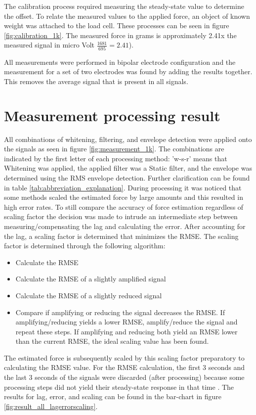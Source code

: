 The calibration process required measuring the steady-state value to determine the offset. To relate the measured values to the applied force, an object of known weight was attached to the load cell. These processes can be seen in figure \ref{fig:calibration_1k}. The measured force in grams is approximately 2.41x the measured signal in micro Volt $\frac{1681}{695} = 2.41$).

All measurements were performed in bipolar electrode configuration and the measurement for a set of two electrodes was found by adding the results together. This removes the average signal that is present in all signals.

\section{Measurement processing result}
All combinations of whitening, filtering, and envelope detection were applied onto the signals as seen in figure \ref{fig:measurement_1k}. The combinations are indicated by the first letter of each processing method: 'w-s-r' means that Whitening was applied, the applied filter was a Static filter, and the envelope was determined using the RMS envelope detection. Further clarification can be found in table \ref{tab:abbreviation_explanation}.
During processing it was noticed that some methods scaled the estimated force by large amounts and this resulted in high error rates. To still compare the accuracy of force estimation regardless of scaling factor the decision was made to intrude an intermediate step between measuring/compensating the lag and calculating the error. After accounting for the lag, a scaling factor is determined that minimizes the RMSE. The scaling factor is determined through the following algorithm:
\begin{itemize}
    \item Calculate the RMSE
    \item Calculate the RMSE of a slightly amplified signal
    \item Calculate the RMSE of a slightly reduced signal
    \item Compare if amplifying or reducing the signal decreases the RMSE. If amplifying/reducing yields a lower RMSE, amplify/reduce the signal and repeat these steps. If amplifying and reducing both yield an RMSE lower than the current RMSE, the ideal scaling value has been found.
\end{itemize}

The estimated force is subsequently scaled by this scaling factor preparatory to calculating the RMSE value. For the RMSE calculation, the first 3 seconds and the last 3 seconds of the signals were discarded (after processing) because some processing steps did not yield their steady-state response in that time \cite{transient_response}. The results for lag, error, and scaling can be found in the bar-chart in figure \ref{fig:result_all_lagerrorscaling}. 

